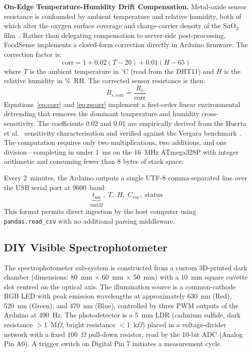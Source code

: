 \documentclass{ieeeaccess}
\begin{document}
\textbf{On-Edge Temperature-Humidity Drift Compensation.} Metal-oxide sensor resistance is confounded by ambient temperature and relative humidity, both of which alter the oxygen surface coverage and charge-carrier density of the SnO$_2$ film~\cite{Huerta2016}. Rather than delegating compensation to server-side post-processing, FoodSense implements a closed-form correction directly in Arduino firmware. The correction factor is:
\begin{equation}
  \text{corr} = 1 + 0.02(T - 20) + 0.01(H - 65)
  \label{eq:corr}
\end{equation}
where $T$ is the ambient temperature in $^{\circ}$C (read from the DHT11) and $H$ is the relative humidity in \%~RH. The corrected sensor resistance is then:
\begin{equation}
  R_{s,\text{corr}} = \frac{R_s}{\text{corr}}
  \label{eq:rscorr}
\end{equation}
Equations~\eqref{eq:corr} and \eqref{eq:rscorr} implement a first-order linear environmental detrending that removes the dominant temperature and humidity cross-sensitivity. The coefficients 0.02 and 0.01 are empirically derived from the Huerta et al.~\cite{Huerta2016} sensitivity characterisation and verified against the Vergara benchmark~\cite{Vergara2012}. The computation requires only two multiplications, two additions, and one division---completing in under 1~ms on the 16~MHz ATmega328P with integer arithmetic and consuming fewer than 8 bytes of stack space.

Every 2~minutes, the Arduino outputs a single UTF-8 comma-separated line over the USB serial port at 9600~baud:
\begin{equation*}
  \underbrace{t_{\text{ms}}}_{\text{uint32}},\; T,\; H,\; C_{\text{voc}},\; \text{status}
\end{equation*}
This format permits direct ingestion by the host computer using \texttt{pandas.read\_csv} with no additional parsing middleware.

\subsection{DIY Visible Spectrophotometer}

The spectrophotometer sub-system is constructed from a custom 3D-printed dark chamber (dimensions: 80~mm $\times$ 60~mm $\times$ 50~mm) with a 10~mm square cuvette slot centred on the optical axis. The illumination source is a common-cathode RGB LED with peak emission wavelengths at approximately 630~nm (Red), 520~nm (Green), and 470~nm (Blue), controlled by three PWM outputs of the Arduino at 490~Hz. The photodetector is a 5~mm LDR (cadmium sulfide, dark resistance $>$1~M$\Omega$, bright resistance $<$1~k$\Omega$) placed in a voltage-divider network with a fixed 100~$\Omega$ pull-down resistor, read by the 10-bit ADC (Analog Pin A0). A trigger switch on Digital Pin 7 initiates a measurement cycle.
\end{document}
